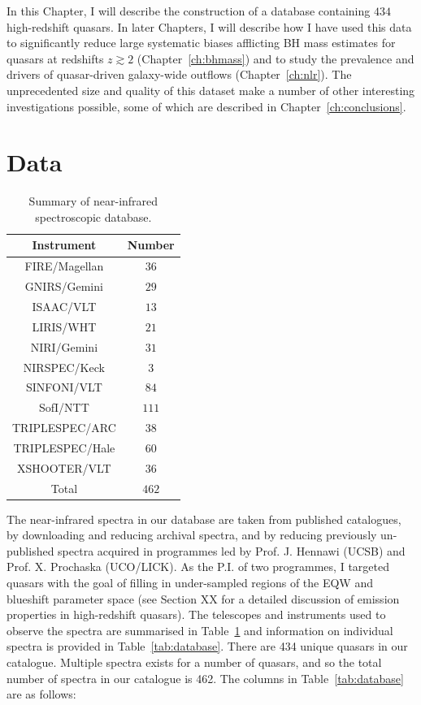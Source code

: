 In this Chapter, I will describe the construction of a database containing $434$ high-redshift quasars. 
In later Chapters, I will describe how I have used this data to significantly reduce large systematic biases afflicting BH mass estimates for quasars at redshifts $z \gtrsim 2$ (Chapter~\ref{ch:bhmass}) and to study the prevalence and drivers of quasar-driven galaxy-wide outflows (Chapter~\ref{ch:nlr}). 
The unprecedented size and quality of this dataset make a number of other interesting investigations possible, some of which are described in Chapter~\ref{ch:conclusions}. 

\section{Data}

\begin{table}
  \footnotesize
  \centering
  \caption{Summary of near-infrared spectroscopic database.}
  \label{tab:data_summary}
    \begin{tabular}{cc} 
    \hline
    Instrument & Number \\  
    \hline
    FIRE/Magellan   & $36$ \\
    GNIRS/Gemini    & $29$ \\
    ISAAC/VLT       & $13$  \\
    LIRIS/WHT       & $21$  \\
    NIRI/Gemini     & $31$ \\
    NIRSPEC/Keck    & $3$   \\ 
    SINFONI/VLT     & $84$ \\
    SofI/NTT        & $111$ \\
    TRIPLESPEC/ARC  & $38$ \\
    TRIPLESPEC/Hale & $60$ \\
    XSHOOTER/VLT    & $36$  \\
    \hline
    Total & $462$ \\
    \hline
    \end{tabular}
\end{table}

The near-infrared spectra in our database are taken from published catalogues, by downloading and reducing
archival spectra, and by reducing previously un-published spectra acquired in programmes led by Prof. J. Hennawi (UCSB) and Prof. X. Prochaska (UCO/LICK). 
As the P.I. of two programmes, I targeted quasars with the goal of filling in under-sampled regions of the  EQW and blueshift parameter space (see Section XX for a detailed discussion of  emission properties in high-redshift quasars).
The telescopes and instruments used to observe the spectra are summarised in Table~\ref{tab:data_summary} and information on individual spectra is provided in Table~\ref{tab:database}.
There are 434 unique quasars in our catalogue. 
Multiple spectra exists for a number of quasars, and so the total number of spectra in our catalogue is 462. 
The columns in Table~\ref{tab:database} are as follows: 

